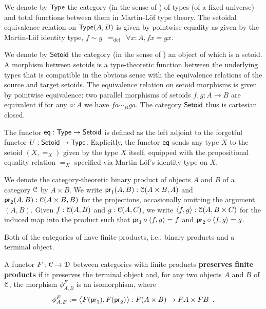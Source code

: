 \documentclass[a4paper,USenglish]{lipics}
\newcommand{\fat}[1]{\textbf{#1}}
\begin{document}
\begin{defn}
\label{def:set_setoid}
 We denote by $\Set$ the category (in the sense of ) of types (of a fixed universe) and total functions between them in Martin-L\"of type theory. 
 The setoidal equivalence relation on $\Set(A,B)$ is given by pointwise equality as given by the Martin-Löf identity type,
   $f \sim g \enspace =_{\text{def}} \enspace \forall x:A, fx = gx$.
 
 We denote by $\Setoid$ the category (in the sense of ) an object of which is a setoid.
 A morphism between setoids is a type-theoretic function between the underlying types that is compatible in the obvious sense with the equivalence relations of the source and target setoids.
 The equivalence relation on setoid morphisms is given by pointwise equivalence:
 two parallel morphisms of setoids $f,g:A\to B$ are equivalent if for any $a:A$ we have $fa \sim_B ga$.
 The category $\Setoid$ thus is cartesian closed.
 
\end{defn}



\begin{defn}
\label{def:eq}
 The functor $\eq : \Set\to\Setoid$ is defined as the left adjoint to the forgetful functor $U : \Setoid \to \Set$.
  Explicitly, the functor $\eq$ sends any type $X$ to the setoid $(X,=_X)$ given by the type $X$ itself, equipped
  with the propositional equality relation $=_X$ specified via Martin-L\"of's identity type on $X$.
\end{defn}


\begin{rem}
  We denote the category-theoretic binary product of objects $A$ and $B$ of a category $\C$ by $A\times B$.
  We write $\pr_1(A,B) : \C(A\times B, A)$ and $\pr_2(A,B) :\C(A\times B, B)$ for the projections, occasionally omitting the 
  argument $(A,B)$.
  Given $f : \C(A, B)$ and $g : \C(A,C)$, we write $\langle f,g\rangle : \C(A,B\times C)$ for the induced map into the product such that
  $\comp{\langle f,g\rangle}{\pr_1} = f$ and $\comp{\langle f,g\rangle}{\pr_2} = g$.
\end{rem}

Both of the categories of  have finite products, i.e., binary products and a terminal object.

\begin{defn}
\label{def:monoidal_functor}
 A functor $F:\C\to\D$ between categories with finite products \fat{preserves finite products} if it preserves the terminal object and,
 for any two objects $A$ and $B$ of $\C$,
  the morphism $\phi^F_{A,B}$ is an isomorphism, where
 \[ \phi^F_{A,B} := \bigl\langle F(\pr_1), F(\pr_2) \bigr\rangle : F(A \times B) \to FA\times FB \enspace . \] %
\end{defn}
\end{document}
